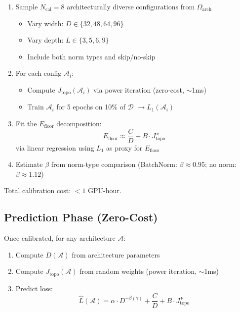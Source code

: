 \documentclass[11pt, a4paper]{article}
\theoremstyle{plain}
\begin{document}
\begin{enumerate}
\item Sample $N_{\mathrm{cal}} = 8$ architecturally diverse configurations from $\Omega_{\mathrm{arch}}$
    \begin{itemize}
    \item Vary width: $D \in \{32, 48, 64, 96\}$
    \item Vary depth: $L \in \{3, 5, 6, 9\}$
    \item Include both norm types and skip/no-skip
    \end{itemize}
\item For each config $\mathcal{A}_i$:
    \begin{itemize}
    \item Compute $J_{\mathrm{topo}}(\mathcal{A}_i)$ via power iteration (zero-cost, $\sim$1ms)
    \item Train $\mathcal{A}_i$ for 5 epochs on 10\% of $\mathcal{D}$ $\rightarrow L_1(\mathcal{A}_i)$
    \end{itemize}
\item Fit the $E_{\mathrm{floor}}$ decomposition:
    \begin{equation}
    E_{\mathrm{floor}} \approx \frac{C}{D} + B \cdot J_{\mathrm{topo}}^{\,\nu}
    \end{equation}
    via linear regression using $L_1$ as proxy for $E_{\mathrm{floor}}$
\item Estimate $\beta$ from norm-type comparison (BatchNorm: $\beta \approx 0.95$; no norm: $\beta \approx 1.12$)
\end{enumerate}

Total calibration cost: $< 1$ GPU-hour.

\subsection{Prediction Phase (Zero-Cost)}

Once calibrated, for any architecture $\mathcal{A}$:

\begin{enumerate}
\item Compute $D(\mathcal{A})$ from architecture parameters
\item Compute $J_{\mathrm{topo}}(\mathcal{A})$ from random weights (power iteration, $\sim$1ms)
\item Predict loss:
    \begin{equation}
    \hat{L}(\mathcal{A}) = \alpha \cdot D^{-\beta(\gamma)} + \frac{C}{D} + B \cdot J_{\mathrm{topo}}^{\,\nu}
    \end{equation}
\end{enumerate}
\end{document}
